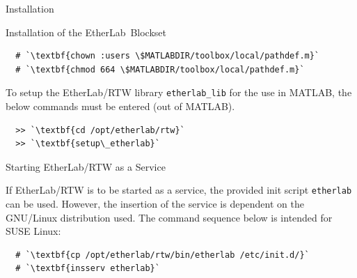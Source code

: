 \begin{ighsec}{Installation}
\begin{ighsec}{Installation of the EtherLab\regTM\ Blockset}
\begin{lstlisting}
  # `\textbf{chown :users \$MATLABDIR/toolbox/local/pathdef.m}`
  # `\textbf{chmod 664 \$MATLABDIR/toolbox/local/pathdef.m}`
\end{lstlisting}

To setup the EtherLab\regTM/RTW library \texttt{etherlab\_lib} for the
use in MATLAB\regTM, the below commands must be entered (out of
MATLAB\regTM).

\begin{lstlisting}
  >> `\textbf{cd /opt/etherlab/rtw}`
  >> `\textbf{setup\_etherlab}`
\end{lstlisting}

\end{ighsec}

\begin{ighsec}{Starting EtherLab\regTM/RTW as a Service}
\label{sec:dienst}

If EtherLab\regTM/RTW is to be started as a service, the provided init
script \texttt{etherlab} can be used. However, the insertion of the
service is dependent on the GNU/Linux distribution used. The command
sequence below is intended for SUSE Linux:

\begin{lstlisting}
  # `\textbf{cp /opt/etherlab/rtw/bin/etherlab /etc/init.d/}`
  # `\textbf{insserv etherlab}`
\end{lstlisting}

\end{ighsec}

\end{ighsec}


